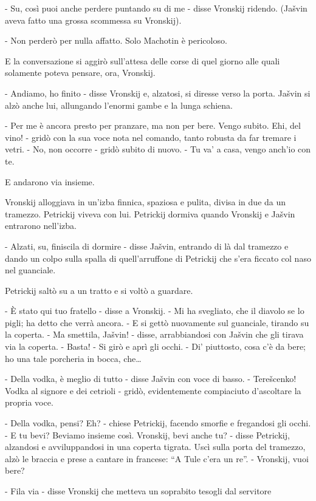 - Su, così puoi anche perdere puntando su di me - disse Vronskij ridendo. (Jašvin aveva fatto una grossa scommessa su Vronskij). 

- Non perderò per nulla affatto. Solo Machotin è pericoloso. 

E la conversazione si aggirò sull'attesa delle corse di quel giorno alle quali solamente poteva pensare, ora, Vronskij. 

- Andiamo, ho finito - disse Vronskij e, alzatosi, si diresse verso la porta. Jašvin si alzò anche lui, allungando l'enormi gambe e la lunga schiena. 

- Per me è ancora presto per pranzare, ma non per bere. Vengo subito. Ehi, del vino! - gridò con la sua voce nota nel comando, tanto robusta da far tremare i vetri. - No, non occorre - gridò subito di nuovo. - Tu va' a casa, vengo anch'io con te. 

E andarono via insieme. 

Vronskij alloggiava in un'izba finnica, spaziosa e pulita, divisa in due da un tramezzo. Petrickij viveva con lui. Petrickij dormiva quando Vronskij e Jašvin entrarono nell'izba. 

- Alzati, su, finiscila di dormire - disse Jašvin, entrando di là dal tramezzo e dando un colpo sulla spalla di quell'arruffone di Petrickij che s'era ficcato col naso nel guanciale. 

Petrickij saltò su a un tratto e si voltò a guardare. 

- È stato qui tuo fratello - disse a Vronskij. - Mi ha svegliato, che il diavolo se lo pigli; ha detto che verrà ancora. - E si gettò nuovamente sul guanciale, tirando su la coperta. - Ma smettila, Jašvin! - disse, arrabbiandosi con Jašvin che gli tirava via la coperta. - Basta! - Si girò e aprì gli occhi. - Di' piuttosto, cosa c'è da bere; ho una tale porcheria in bocca, che\ldots{} 

- Della vodka, è meglio di tutto - disse Jašvin con voce di basso. - Terešcenko! Vodka al signore e dei cetrioli - gridò, evidentemente compiaciuto d'ascoltare la propria voce. 

- Della vodka, pensi? Eh? - chiese Petrickij, facendo smorfie e fregandosi gli occhi. - E tu bevi? Beviamo insieme così. Vronskij, bevi anche tu? - disse Petrickij, alzandosi e avviluppandosi in una coperta tigrata. Uscì sulla porta del tramezzo, alzò le braccia e prese a cantare in francese: ``A Tule c'era un re''. - Vronskij, vuoi bere? 

- Fila via - disse Vronskij che metteva un soprabito tesogli dal servitore 

